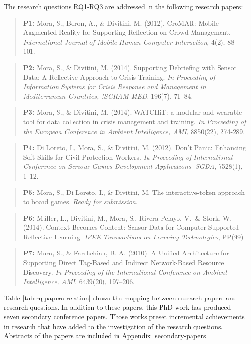 The research questions RQ1-RQ3 are addressed in the following research papers:
\begin{quote}
	\textbf{P1:} Mora, S., Boron, A., \& Divitini, M. (2012). CroMAR: Mobile Augmented Reality for Supporting Reflection on Crowd Management. \emph{International Journal of Mobile Human Computer Interaction}, 4(2), 88--101. 
\end{quote}
\begin{quote}
	\textbf{P2:} Mora, S., \& Divitini, M. (2014). Supporting Debriefing with Sensor Data: A Reflective Approach to Crisis Training. \emph{In Proceeding of Information Systems for Crisis Response and Management in Mediterranean Countries, ISCRAM-MED}, 196(7), 71--84. 
\end{quote}
\begin{quote}
	\textbf{P3:} Mora, S., \& Divitini, M. (2014). WATCHiT: a modular and wearable tool for data collection in crisis management and training. \emph{In Proceeding of the European Conference in Ambient Intelligence, AMI}, 8850(22), 274-289. 
\end{quote}
\begin{quote}
	\textbf{P4:} Di Loreto, I., Mora, S., \& Divitini, M. (2012). Don't Panic: Enhancing Soft Skills for Civil Protection Workers. \emph{In Proceeding of International Conference on Serious Games Development Applications, SGDA}, 7528(1), 1--12. 
\end{quote}
\begin{quote}
	\textbf{P5:} Mora, S., Di Loreto, I., \& Divitini, M. The interactive-token approach to board games. \emph{Ready for submission}. 
\end{quote}
\begin{quote}
	\textbf{P6:} Müller, L., Divitini, M., Mora, S., Rivera-Pelayo, V., \& Stork, W. (2014). Context Becomes Content: Sensor Data for Computer Supported Reflective Learning. \emph{IEEE Transactions on Learning Technologies}, PP(99). 
\end{quote}
\begin{quote}
	\textbf{P7:} Mora, S., \& Farshchian, B. A. (2010). A Unified Architecture for Supporting Direct Tag-Based and Indirect Network-Based Resource Discovery. \emph{In Proceeding of the International Conference on Ambient Intelligence, AMI}, 6439(20), 197--206. 
\end{quote}

Table \ref{tab:rq-papers-relation} shows the mapping between research papers and research questions. In addition to these papers, this PhD work has produced seven secondary conference papers. Those works preset incremental achievements in research that have added to the investigation of the research questions. Abstracts of the papers are included in Appendix \ref{secondary-papers}


